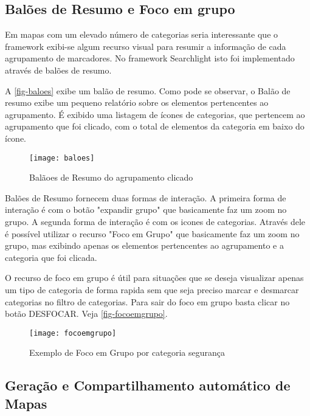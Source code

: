 \subsection{Balões de Resumo e Foco em grupo}
Em mapas com um elevado número de  categorias seria interessante que o framework exibi-se algum recurso visual para resumir a informação de cada agrupamento de marcadores. 
No framework Searchlight isto foi implementado através de balões de resumo.

A \autoref{fig-baloes} exibe um balão de resumo. Como pode se observar, o Balão de resumo exibe um pequeno relatório sobre os elementos pertencentes ao agrupamento. É exibido uma listagem de ícones de categorias, que pertencem ao agrupamento que foi clicado, com o total de elementos da categoria em baixo do ícone. 

\begin{figure}[htb]
	\caption{\label{fig-baloes}Balãoes de Resumo do agrupamento clicado}
	\begin{center}
	    \texttt{[image: baloes]}
	\end{center}
\end{figure}

Balões de Resumo fornecem duas formas de interação. A primeira forma de interação é com o botão "expandir grupo" que basicamente faz um zoom no grupo. A segunda forma de interação é com os icones de categorias. Através dele é possível utilizar o recurso "Foco em Grupo" que basicamente faz um zoom no grupo, mas exibindo apenas os elementos pertencentes ao agrupamento e a categoria que foi clicada.

O recurso de foco em grupo é útil para situações que se deseja visualizar apenas um tipo de categoria de forma rapida sem que seja preciso marcar e desmarcar categorias no filtro de categorias. Para sair do foco em grupo basta clicar no botão DESFOCAR. Veja \autoref{fig-focoemgrupo}.

 \begin{figure}[htb]
	\caption{\label{fig-focoemgrupo}Exemplo de Foco em Grupo por categoria segurança}
	\begin{center}
	    \texttt{[image: focoemgrupo]}
	\end{center}
\end{figure}


\subsection{Geração e Compartilhamento automático de Mapas}

